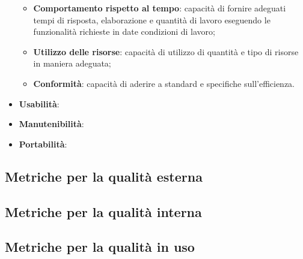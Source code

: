 \begin{itemize}
	\begin{itemize}
	\item \textbf{Comportamento rispetto al tempo}: capacità di fornire adeguati tempi di risposta, elaborazione e quantità di lavoro eseguendo le funzionalità richieste in date condizioni di lavoro;
	\item \textbf{Utilizzo delle risorse}: capacità di utilizzo di quantità e tipo di risorse in maniera adeguata;
	\item \textbf{Conformità}: capacità di aderire a standard e specifiche sull'efficienza.
	\end{itemize}
\item \textbf{Usabilità}:
\item \textbf{Manutenibilità}:
\item \textbf{Portabilità}:
\end{itemize}

\subsection{Metriche per la qualità esterna}

\subsection{Metriche per la qualità interna}

\subsection{Metriche per la qualità in uso}
